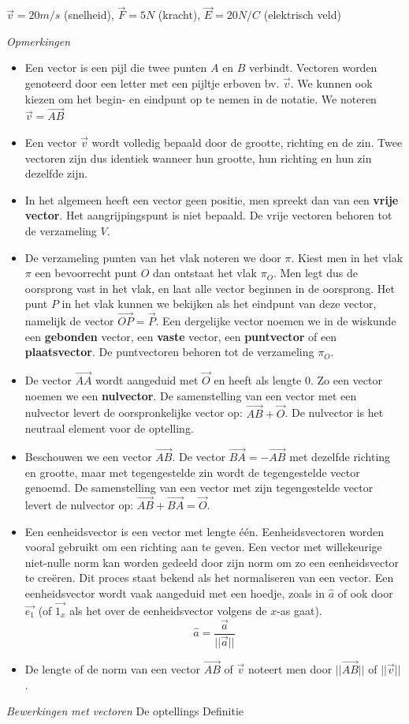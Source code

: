 \begin{voorbeeld}
	$\vec{v}=20 m/s$ (snelheid), $\vec{F}=5N$ (kracht), $\vec{E}=20 N/C$ (elektrisch veld)
\end{voorbeeld}

\emph{Opmerkingen}
\begin{itemize}
	\item Een vector is een pijl die twee punten $A$ en $B$ verbindt. Vectoren worden genoteerd door een letter met een pijltje erboven bv. $\vec{v}$. We kunnen ook kiezen om het begin- en eindpunt op te nemen in de notatie. We noteren $\vec{v}=\vec{AB}$
	\item Een vector $\vec{v}$ wordt volledig bepaald door de grootte, richting en de zin. Twee vectoren zijn dus identiek wanneer hun grootte, hun richting en hun zin dezelfde zijn.
	\item In het algemeen heeft een vector geen positie, men spreekt dan van een \textbf{vrije vector}. Het aangrijpingspunt is niet bepaald. De vrije vectoren behoren tot de verzameling $V$.
	\item De verzameling punten van het vlak noteren we door $\pi$. Kiest men in het vlak $\pi$ een bevoorrecht punt $O$ dan ontstaat het vlak $\pi_O$. Men legt dus de oorsprong  vast in het vlak, en laat alle vector beginnen in de oorsprong. Het punt $P$ in het vlak kunnen we bekijken als het eindpunt van deze vector, namelijk de vector $\vec{OP}=\vec{P}$. Een dergelijke vector noemen we in de wiskunde een \textbf{gebonden} vector, een \textbf{vaste} vector, een \textbf{puntvector} of een \textbf{plaatsvector}. De puntvectoren behoren tot de verzameling $\pi_O$.
	\item De vector $\vec{AA}$ wordt aangeduid met $\vec{O}$ en heeft als lengte 0. Zo een vector noemen we een \textbf{nulvector}. De samenstelling van een vector met een nulvector levert de oorspronkelijke vector op: $\vec{AB}+\vec{O}$. De nulvector is het neutraal element voor de optelling.
	\item Beschouwen we een vector $\vec{AB}$. De vector $\vec{BA}=-\vec{AB}$ met dezelfde richting en grootte, maar met tegengestelde zin wordt de tegengestelde vector genoemd. De samenstelling van een vector met zijn tegengestelde vector levert de nulvector op: $\vec{AB}+\vec{BA}=\vec{O}$.
	\item Een eenheidsvector is een vector met lengte \'e\'en. Eenheidsvectoren worden vooral gebruikt om een richting aan te geven. Een vector met willekeurige niet-nulle norm kan worden gedeeld door zijn norm om zo een eenheidsvector te cre\"eren. Dit proces staat bekend als het normaliseren van een vector. Een eenheidsvector wordt vaak aangeduid met een hoedje, zoals in $\hat{a}$  of ook door $\vec{e_1}$ (of $\vec{1_x}$ als het over de eenheidsvector volgens de $x$-as gaat).
	\begin{equation*}
	\hat{a} = \frac{\vec{a}}{||\vec{a}||}
	\end{equation*}
	\item De lengte of de norm van een vector $\vec{AB}$ of $\vec{v}$ noteert men door $||\vec{AB}||$ of $||\vec{v}||$.
\end{itemize}
\emph{Bewerkingen met vectoren}
De optellings
Definitie

